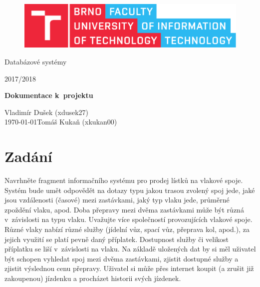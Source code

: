 \documentclass[12pt, a4paper, titlepage]{article}
\begin{document}
\begin{titlepage}
	\begin{center}

		\begin{figure}[htb]
			\centering
			\includegraphics[width=0.85\hsize]{fitlogo.pdf}
		\end{figure}


		{\huge Databázové systémy} \\
		\medskip

		{\huge 2017/2018} \\
		\bigskip

		{\Huge \textbf{Dokumentace k~projektu}} \\
		\bigskip

	\end{center}

	\begin{large}
		\hfill Vladimír Dušek (xdusek27)
		\medskip \\
		\today \hfill Tomáš Kukaň (xkukan00)
	\end{large}

\end{titlepage}


\tableofcontents
\newpage


\section{Zadání}
\medskip

Navrhněte fragment informačního systému pro prodej lístků na vlakové spoje. Systém bude umět odpovědět na dotazy typu jakou trasou zvolený spoj jede, jaké jsou vzdálenosti (časové) mezi zastávkami, jaký typ vlaku jede, průměrné zpoždění vlaku, apod. Doba přepravy mezi dvěma zastávkami může být různá v~závislosti na typu vlaku. Uvažujte více společností provozujících vlakové spoje. Různé vlaky nabízí různé služby (jídelní vůz, spací vůz, přeprava kol, apod.), za jejich využití se platí pevně daný příplatek. Dostupnost služby či velikost příplatku se liší v~závislosti na vlaku. Na základě uložených dat by si měl uživatel být schopen vyhledat spoj mezi dvěma zastávkami, zjistit dostupné služby a zjistit výslednou cenu přepravy. Uživatel si může přes internet koupit (a zrušit již zakoupenou) jízdenku a procházet historii svých jízdenek.
\bigskip
\end{document}
